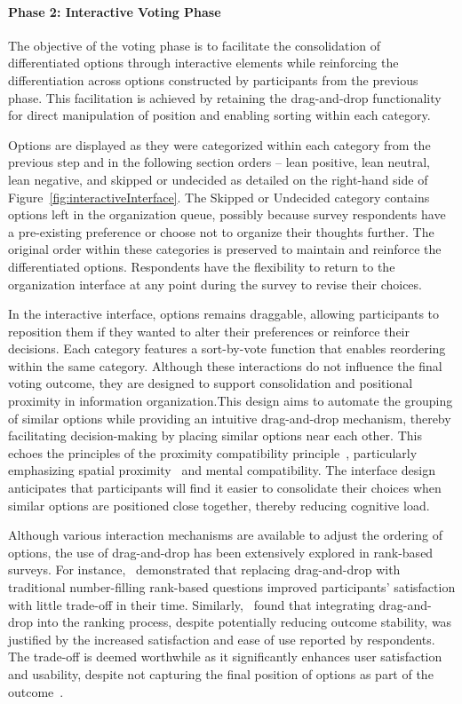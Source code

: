 \paragraph{Phase 2: Interactive Voting Phase}

The objective of the voting phase is to facilitate the consolidation of differentiated options through interactive elements while reinforcing the differentiation across options constructed by participants from the previous phase. This facilitation is achieved by retaining the drag-and-drop functionality for direct manipulation of position and enabling sorting within each category.

Options are displayed as they were categorized within each category from the previous step and in the following section orders -- lean positive, lean neutral, lean negative, and skipped or undecided as detailed on the right-hand side of Figure~\ref{fig:interactiveInterface}. The Skipped or Undecided category contains options left in the organization queue, possibly because survey respondents have a pre-existing preference or choose not to organize their thoughts further. The original order within these categories is preserved to maintain and reinforce the differentiated options. Respondents have the flexibility to return to the organization interface at any point during the survey to revise their choices.

In the interactive interface, options remains draggable, allowing participants to reposition them if they wanted to alter their preferences or reinforce their decisions. Each category features a sort-by-vote function that enables reordering within the same category. Although these interactions do not influence the final voting outcome, they are designed to support consolidation and positional proximity in information organization.This design aims to automate the grouping of similar options while providing an intuitive drag-and-drop mechanism, thereby facilitating decision-making by placing similar options near each other. This echoes the principles of the proximity compatibility principle~\cite{wickens1995proximity}, particularly emphasizing spatial proximity~\cite{wickens1990proximity} and mental compatibility. The interface design anticipates that participants will find it easier to consolidate their choices when similar options are positioned close together, thereby reducing cognitive load.

Although various interaction mechanisms are available to adjust the ordering of options, the use of drag-and-drop has been extensively explored in rank-based surveys. For instance,~\textcite{krosnick2018measurement} demonstrated that replacing drag-and-drop with traditional number-filling rank-based questions improved participants' satisfaction with little trade-off in their time. Similarly,~\textcite{timbrook2013comparison} found that integrating drag-and-drop into the ranking process, despite potentially reducing outcome stability, was justified by the increased satisfaction and ease of use reported by respondents. The trade-off is deemed worthwhile as it significantly enhances user satisfaction and usability, despite not capturing the final position of options as part of the outcome~\cite{rintoulVisualAnimatedResponse}.

